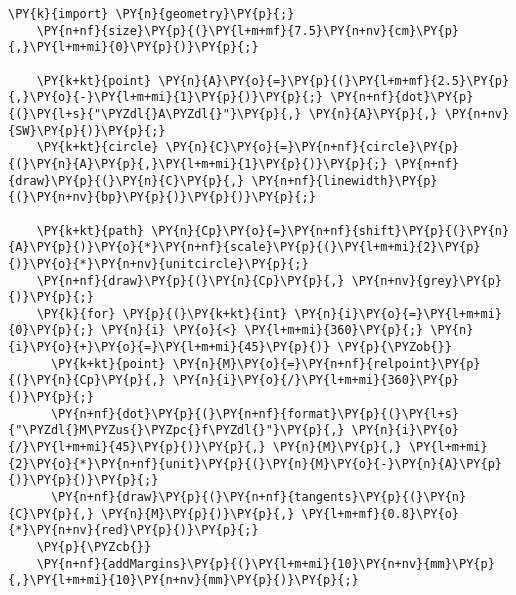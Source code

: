 \begin{Verbatim}[commandchars=\\\{\}]
    \PY{k}{import} \PY{n}{geometry}\PY{p}{;}
    \PY{n+nf}{size}\PY{p}{(}\PY{l+m+mf}{7.5}\PY{n+nv}{cm}\PY{p}{,}\PY{l+m+mi}{0}\PY{p}{)}\PY{p}{;}

    \PY{k+kt}{point} \PY{n}{A}\PY{o}{=}\PY{p}{(}\PY{l+m+mf}{2.5}\PY{p}{,}\PY{o}{-}\PY{l+m+mi}{1}\PY{p}{)}\PY{p}{;} \PY{n+nf}{dot}\PY{p}{(}\PY{l+s}{"\PYZdl{}A\PYZdl{}"}\PY{p}{,} \PY{n}{A}\PY{p}{,} \PY{n+nv}{SW}\PY{p}{)}\PY{p}{;}
    \PY{k+kt}{circle} \PY{n}{C}\PY{o}{=}\PY{n+nf}{circle}\PY{p}{(}\PY{n}{A}\PY{p}{,}\PY{l+m+mi}{1}\PY{p}{)}\PY{p}{;} \PY{n+nf}{draw}\PY{p}{(}\PY{n}{C}\PY{p}{,} \PY{n+nf}{linewidth}\PY{p}{(}\PY{n+nv}{bp}\PY{p}{)}\PY{p}{)}\PY{p}{;}

    \PY{k+kt}{path} \PY{n}{Cp}\PY{o}{=}\PY{n+nf}{shift}\PY{p}{(}\PY{n}{A}\PY{p}{)}\PY{o}{*}\PY{n+nf}{scale}\PY{p}{(}\PY{l+m+mi}{2}\PY{p}{)}\PY{o}{*}\PY{n+nv}{unitcircle}\PY{p}{;}
    \PY{n+nf}{draw}\PY{p}{(}\PY{n}{Cp}\PY{p}{,} \PY{n+nv}{grey}\PY{p}{)}\PY{p}{;}
    \PY{k}{for} \PY{p}{(}\PY{k+kt}{int} \PY{n}{i}\PY{o}{=}\PY{l+m+mi}{0}\PY{p}{;} \PY{n}{i} \PY{o}{<} \PY{l+m+mi}{360}\PY{p}{;} \PY{n}{i}\PY{o}{+}\PY{o}{=}\PY{l+m+mi}{45}\PY{p}{)} \PY{p}{\PYZob{}}
      \PY{k+kt}{point} \PY{n}{M}\PY{o}{=}\PY{n+nf}{relpoint}\PY{p}{(}\PY{n}{Cp}\PY{p}{,} \PY{n}{i}\PY{o}{/}\PY{l+m+mi}{360}\PY{p}{)}\PY{p}{;}
      \PY{n+nf}{dot}\PY{p}{(}\PY{n+nf}{format}\PY{p}{(}\PY{l+s}{"\PYZdl{}M\PYZus{}\PYZpc{}f\PYZdl{}"}\PY{p}{,} \PY{n}{i}\PY{o}{/}\PY{l+m+mi}{45}\PY{p}{)}\PY{p}{,} \PY{n}{M}\PY{p}{,} \PY{l+m+mi}{2}\PY{o}{*}\PY{n+nf}{unit}\PY{p}{(}\PY{n}{M}\PY{o}{-}\PY{n}{A}\PY{p}{)}\PY{p}{)}\PY{p}{;}
      \PY{n+nf}{draw}\PY{p}{(}\PY{n+nf}{tangents}\PY{p}{(}\PY{n}{C}\PY{p}{,} \PY{n}{M}\PY{p}{)}\PY{p}{,} \PY{l+m+mf}{0.8}\PY{o}{*}\PY{n+nv}{red}\PY{p}{)}\PY{p}{;}
    \PY{p}{\PYZcb{}}
    \PY{n+nf}{addMargins}\PY{p}{(}\PY{l+m+mi}{10}\PY{n+nv}{mm}\PY{p}{,}\PY{l+m+mi}{10}\PY{n+nv}{mm}\PY{p}{)}\PY{p}{;}
\end{Verbatim}
